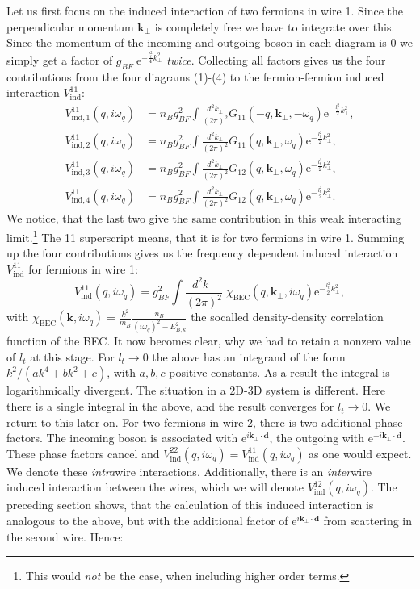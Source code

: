 Let us first focus on the induced interaction of two fermions in wire 1. Since the perpendicular momentum $\mathbf{k}_\perp$ is completely free we have to integrate over this. Since the momentum of the incoming and outgoing boson in each diagram is 0 we simply get a factor of $g_{BF}\; \text{e}^{-\frac{l_t^2}{4}k_\perp^2}$ \textit{twice}. Collecting all factors gives us the four contributions from the four diagrams (1)-(4) to the fermion-fermion induced interaction $V_{\text{ind}}^{11}$: 
\begin{align}
V^{11}_{\text{ind}, 1}(q,i\omega_q) &= n_Bg_{BF}^2\int\frac{d^2k_\perp}{(2\pi)^2}G_{11}(-q,\mathbf{k}_\perp,-\omega_q)\text{e}^{-\frac{l_t^2}{2}k_\perp^2}, \nonumber \\
V^{11}_{\text{ind}, 2}(q,i\omega_q) &= n_Bg_{BF}^2\int\frac{d^2k_\perp}{(2\pi)^2}G_{11}(q,\mathbf{k}_\perp,\omega_q)\text{e}^{-\frac{l_t^2}{2}k_\perp^2}, \nonumber \\
V^{11}_{\text{ind}, 3}(q,i\omega_q) &= n_Bg_{BF}^2\int\frac{d^2k_\perp}{(2\pi)^2}G_{12}(q,\mathbf{k}_\perp,\omega_q)\text{e}^{-\frac{l_t^2}{2}k_\perp^2}, \nonumber \\
V^{11}_{\text{ind}, 4}(q,i\omega_q) &= n_Bg_{BF}^2\int\frac{d^2k_\perp}{(2\pi)^2}G_{12}(q,\mathbf{k}_\perp,\omega_q)\text{e}^{-\frac{l_t^2}{2}k_\perp^2}. 
\end{align}
We notice, that the last two give the same contribution in this weak interacting limit.\footnote{This would \textit{not} be the case, when including higher order terms.} The 11 superscript means, that it is for two fermions in wire 1. Summing up the four contributions gives us the frequency dependent induced interaction $V^{11}_{\text{ind}}$ for fermions in wire 1:
\begin{equation}
V^{11}_{\text{ind}}(q,i\omega_q) = g_{BF}^2\int\frac{d^2k_\perp}{(2\pi)^2}\; \chi_\text{BEC}(q,\mathbf{k}_\perp,i\omega_q)\text{e}^{-\frac{l_t^2}{2}k_\perp^2}, 
\label{eq.V11indXBEC}
\end{equation}
with $\chi_\text{BEC}(\mathbf{k},i\omega_q) = \frac{k^2}{m_B}\frac{n_B}{(i\omega_q)^2 - E_{B,k}^2}$ the socalled density-density correlation function of the BEC. It now becomes clear, why we had to retain a nonzero value of $l_t$ at this stage. For $l_t\to 0$ the above has an integrand of the form $k^2/(ak^4 + bk^2 + c)$, with $a,b,c$ positive constants. As a result the integral is logarithmically divergent. The situation in a 2D-3D system is different. Here there is a single integral in the above, and the result converges for $l_t\to 0$. We return to this later on. For two fermions in wire 2, there is two additional phase factors. The incoming boson is associated with $\text{e}^{i\mathbf{k}_\perp\cdot \mathbf{d}}$, the outgoing with $\text{e}^{-i\mathbf{k}_\perp\cdot \mathbf{d}}$. These phase factors cancel and $V^{22}_{\text{ind}}(q,i\omega_q) = V^{11}_{\text{ind}}(q,i\omega_q)$ as one would expect. We denote these \textit{intra}wire interactions. Additionally, there is an \textit{inter}wire induced interaction between the wires, which we will denote $V_{\text{ind}}^{12}(q,i\omega_q)$. The preceding section shows, that the calculation of this induced interaction is analogous to the above, but with the additional factor of $\text{e}^{i\mathbf{k}_\perp\cdot \mathbf{d}}$ from scattering in the second wire. Hence:
